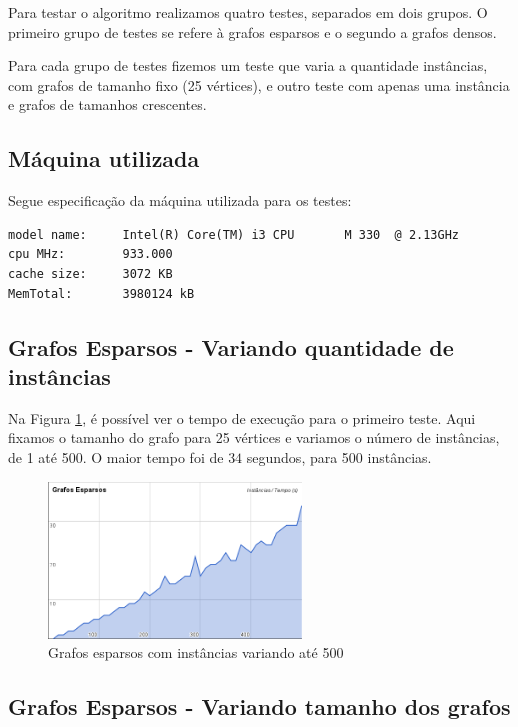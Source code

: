 \documentclass[12pt]{article}
\begin{document}
Para testar o algoritmo realizamos quatro testes, separados em dois grupos. O primeiro grupo de testes se refere à grafos esparsos e o segundo a grafos densos.

Para cada grupo de testes fizemos um teste que varia a quantidade instâncias, com grafos de tamanho fixo (25 vértices), e outro teste com apenas uma instância e grafos de tamanhos crescentes.

\subsection{Máquina utilizada}
\label{maquina}

Segue especificação da máquina utilizada para os testes:
\begin{verbatim}
model name:     Intel(R) Core(TM) i3 CPU       M 330  @ 2.13GHz
cpu MHz:        933.000
cache size:     3072 KB
MemTotal:       3980124 kB
\end{verbatim}

\subsection{Grafos Esparsos - Variando quantidade de instâncias}
\label{esparsos_inst}

	Na Figura \ref{esp_inst_var}, é possível ver o tempo de execução para o primeiro teste. Aqui fixamos o tamanho do grafo para 25 vértices e variamos o número de instâncias, de 1 até 500. O maior tempo foi de $34$ segundos, para 500 instâncias.

\begin{figure}[h!]
	\centering
	\includegraphics[width=0.60\textwidth]{graph_esparso_instvar.png}
	\caption{Grafos esparsos com instâncias variando até 500}
	\label{esp_inst_var}
\end{figure}

\subsection{Grafos Esparsos - Variando tamanho dos grafos}
\label{esparsos_graf}
\end{document}
